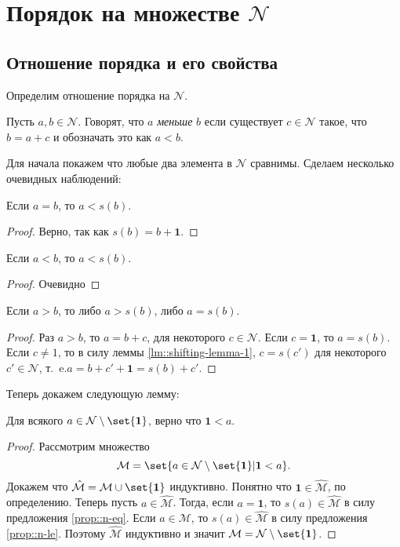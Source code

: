 \documentclass{article}
\newcommand{\ie}{т{.}~e{.}}
\begin{document}
\section{Порядок на множестве \texorpdfstring{$\mathcal{N}$}{N}}
\subsection{Отношение порядка и его свойства}
\noindent Определим отношение порядка на \(\mathcal{N}\).
\begin{definition}
    Пусть \(a, b \in \mathcal{N}\). Говорят, что \(a\) \textit{меньше} \(b\) если существует \(c \in \mathcal{N}\) такое, что \(b = a + c\) и обозначать это как \(a < b\).
\end{definition}
\noindent Для начала покажем что любые два элемента в \(\mathcal{N}\) сравнимы. Сделаем несколько очевидных наблюдений:
\begin{proposition}
    \label{prop::n-eq}
    Если \(a = b\), то \(a < s(b)\).
\end{proposition}
\begin{proof}
    Верно, так как \(s(b) = b + \mathbf{1}\).
\end{proof}
\begin{proposition}
    \label{prop::n-le}
    Если \(a < b\), то \(a < s(b)\). 
\end{proposition}
\begin{proof}
    Очевидно
\end{proof}
\begin{proposition}
    \label{prop::n-ge}
    Если \(a > b\), то либо \(a > s(b)\), либо \(a = s(b)\).
\end{proposition}
\begin{proof}
    Раз \(a > b\), то \(a = b + c\), для некоторого \(c \in \mathcal{N}\). Если \(c = \mathbf{1}\), то \(a = s(b)\). Если \(c \neq 1\), то в силу леммы \ref{lm::shifting-lemma-1}, \(c = s(c')\) для некоторого \(c' \in \mathcal{N}\), \ie \(a = b + c' + \mathbf{1} = s(b) + c'\).
\end{proof}
\noindent Теперь докажем следующую лемму:
\begin{lemma}
    \label{lm::unit-is-smallest}
    Для всякого \(a \in \mathcal{N} \setminus \set{\mathbf{1}}\), верно что \(\mathbf{1} < a\).
\end{lemma}
\begin{proof}
    Рассмотрим множество 
    \[
        \mathcal{M} = \set{a \in \mathcal{N} \setminus \set{\mathbf{1}} | \mathbf{1} < a}.
    \]
    Докажем что \(\hat{\mathcal{M}} = \mathcal{M} \cup \set{\mathbf{1}}\) индуктивно. Понятно что \(\mathbf{1} \in \hat{\mathcal{M}}\), по определению. Теперь пусть \(a \in \hat{\mathcal{M}}\). Тогда, если \(a = \mathbf{1}\), то \(s(a) \in \hat{\mathcal{M}}\) в силу предложения \ref{prop::n-eq}. Если \(a \in \mathcal{M}\), то \(s(a) \in \hat{\mathcal{M}}\) в силу предложения \ref{prop::n-le}. Поэтому \(\hat{\mathcal{M}}\) индуктивно и значит \(\mathcal{M} = \mathcal{N} \setminus \set{\mathbf{1}}\).
\end{proof}
\end{document}
